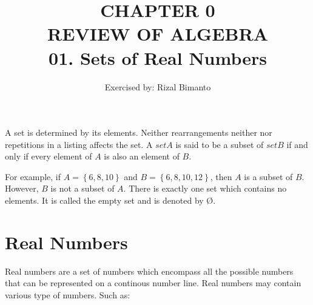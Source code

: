 \documentclass{article}
\title{CHAPTER 0\\
REVIEW OF ALGEBRA\\ 
01. Sets of Real Numbers
}
\author{Exercised by: Rizal Bimanto}
\date{}
\begin{document}
\maketitle
A set is determined by its elements.
Neither rearrangements neither nor repetitions in a listing affects the set.
A $set A$ is said to be a subset of $set B$ if and only if
every element of $A$ is also an element of $B$.\par

For example, if $A = \left\{ 6, 8, 10 \right\}$ and $B = \left\{ 6, 8, 10, 12 \right\}$,
then $A$ is a subset of $B$. However, $B$ is not a subset of $A$.
There is exactly one set which contains no elements.
It is called the empty set and is denoted by Ø.\par

\section{Real Numbers}
Real numbers are a set of numbers which encompass all the possible
numbers that can be represented on a continous number line.
Real numbers may contain various type of numbers. Such as:
\end{document}
